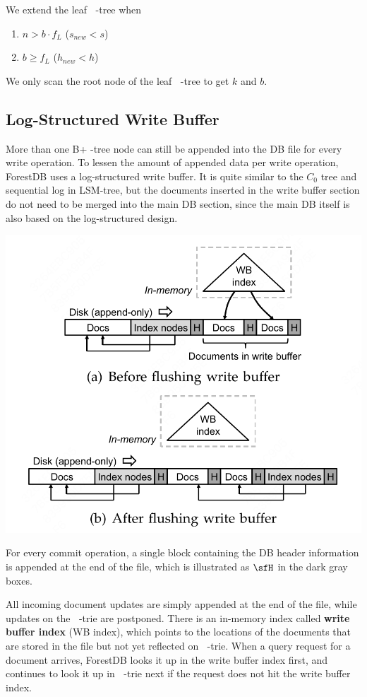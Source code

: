 \documentclass[11pt]{article}
\DeclareMathOperator{\HBP}{\text{HB}^+}
\DeclareMathOperator{\BP}{\text{B}^+}
\begin{document}
We extend the leaf \(\BP\)-tree when
\begin{enumerate}
\item \(n>b\cdot f_L\) (\(s_{new}<s\))
\item \(b\ge f_L\) (\(h_{new}<h\))
\end{enumerate}
We only scan the root node of the leaf \(\BP\)-tree to get \(k\) and \(b\).
\subsection{Log-Structured Write Buffer}
\label{sec:orgb67c834}
More than one B+ -tree node can still be appended into the DB file for every write operation. To
lessen the amount of appended data per write operation, ForestDB uses a log-structured write buffer.
It is quite similar to the \(C_0\) tree and sequential log in LSM-tree, but the documents inserted in
the write buffer section do not need to be merged into the main DB section, since the main DB itself
is also based on the log-structured design.

\begin{center}
\includegraphics[width=.7\textwidth]{../../images/papers/154.png}
\end{center}

For every commit operation, a single block containing the DB header information is appended at the end
of the file, which is illustrated as \(\sfH\) in the dark gray boxes.

All incoming document updates are simply appended at the end of the file, while updates on the
\(\HBP\)-trie are postponed. There is an in-memory index called \textbf{write buffer index} (WB index), which
points to the locations of the documents that are stored in the file but not yet reflected on
\(\HBP\)-trie. When a query request for a document arrives, ForestDB looks it up in the write buffer
index first, and continues to look it up in \(\HBP\)-trie next if the request does not hit the write
buffer index.
\end{document}
